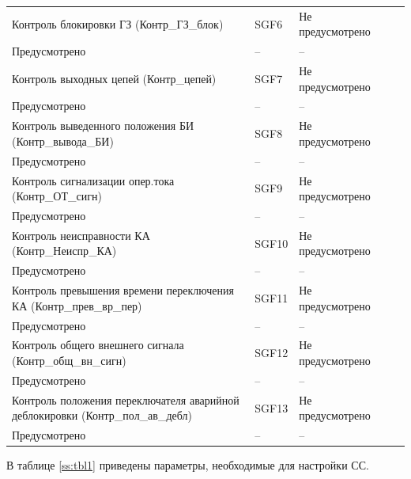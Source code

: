 \begin{longtable}{|>{\centering\arraybackslash}m{5.3cm}|>{\centering\arraybackslash}m{3.3cm}|>{\centering\arraybackslash}m{4.2cm}|>{\centering\arraybackslash}m{1.8cm}|>{\centering\arraybackslash}m{1cm}|}
\hline
\centering Контроль блокировки ГЗ (Контр\_ГЗ\_блок)  & \centering SGF6 & \centering Не предусмотрено \\ Предусмотрено & \centering -- & \centering \arraybackslash -- \\
\hline
\centering Контроль выходных цепей (Контр\_цепей)  & \centering SGF7 & \centering Не предусмотрено \\ Предусмотрено & \centering -- & \centering \arraybackslash -- \\
\hline
\centering Контроль выведенного положения БИ (Контр\_вывода\_БИ)  & \centering SGF8 & \centering Не предусмотрено \\ Предусмотрено & \centering -- & \centering \arraybackslash -- \\
\hline
\centering Контроль сигнализации опер.тока (Контр\_ОТ\_сигн)  & \centering SGF9 & \centering Не предусмотрено \\ Предусмотрено & \centering -- & \centering \arraybackslash -- \\
\hline
\centering Контроль неисправности КА (Контр\_Неиспр\_КА)  & \centering SGF10 & \centering Не предусмотрено \\ Предусмотрено & \centering -- & \centering \arraybackslash -- \\
\hline
\centering Контроль превышения времени переключения КА (Контр\_прев\_вр\_пер)  & \centering SGF11 & \centering Не предусмотрено \\ Предусмотрено & \centering -- & \centering \arraybackslash -- \\
\hline
\centering Контроль общего внешнего сигнала (Контр\_общ\_вн\_сигн)  & \centering SGF12 & \centering Не предусмотрено \\ Предусмотрено & \centering -- & \centering \arraybackslash -- \\
\hline
\centering Контроль положения переключателя аварийной деблокировки (Контр\_пол\_ав\_дебл)  & \centering SGF13 & \centering Не предусмотрено \\ Предусмотрено & \centering -- & \centering \arraybackslash -- \\
\hline
\end{longtable}
\normalsize

\par
В таблице \ref{ss:tbl1} приведены параметры, необходимые для настройки СС. 

